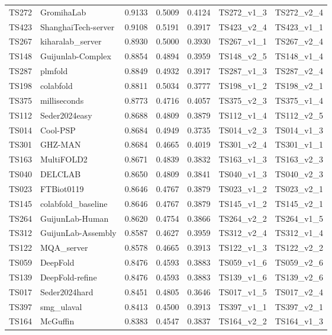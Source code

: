 \begin{table}[ht]
{\begin{tabular}{llrrrll}
TS272 & GromihaLab & 0.9133 & 0.5009 & 0.4124 & TS272\_v1\_3 & TS272\_v2\_4 \\ 
TS423 & ShanghaiTech-server & 0.9108 & 0.5191 & 0.3917 & TS423\_v2\_4 & TS423\_v1\_1 \\ 
TS267 & kiharalab\_server & 0.8930 & 0.5000 & 0.3930 & TS267\_v1\_1 & TS267\_v2\_4 \\ 
TS148 & Guijunlab-Complex & 0.8854 & 0.4894 & 0.3959 & TS148\_v2\_5 & TS148\_v1\_4 \\ 
TS287 & plmfold & 0.8849 & 0.4932 & 0.3917 & TS287\_v1\_3 & TS287\_v2\_4 \\ 
TS198 & colabfold & 0.8811 & 0.5034 & 0.3777 & TS198\_v1\_2 & TS198\_v2\_1 \\ 
TS375 & milliseconds & 0.8773 & 0.4716 & 0.4057 & TS375\_v2\_3 & TS375\_v1\_4 \\ 
TS112 & Seder2024easy & 0.8688 & 0.4809 & 0.3879 & TS112\_v1\_4 & TS112\_v2\_5 \\ 
TS014 & Cool-PSP & 0.8684 & 0.4949 & 0.3735 & TS014\_v2\_3 & TS014\_v1\_3 \\ 
TS301 & GHZ-MAN & 0.8684 & 0.4665 & 0.4019 & TS301\_v2\_4 & TS301\_v1\_1 \\ 
TS163 & MultiFOLD2 & 0.8671 & 0.4839 & 0.3832 & TS163\_v1\_3 & TS163\_v2\_3 \\ 
TS040 & DELCLAB & 0.8650 & 0.4809 & 0.3841 & TS040\_v1\_3 & TS040\_v2\_3 \\ 
TS023 & FTBiot0119 & 0.8646 & 0.4767 & 0.3879 & TS023\_v1\_2 & TS023\_v2\_1 \\ 
TS145 & colabfold\_baseline & 0.8646 & 0.4767 & 0.3879 & TS145\_v1\_2 & TS145\_v2\_1 \\ 
TS264 & GuijunLab-Human & 0.8620 & 0.4754 & 0.3866 & TS264\_v2\_2 & TS264\_v1\_5 \\ 
TS312 & GuijunLab-Assembly & 0.8587 & 0.4627 & 0.3959 & TS312\_v2\_4 & TS312\_v1\_4 \\ 
TS122 & MQA\_server & 0.8578 & 0.4665 & 0.3913 & TS122\_v1\_3 & TS122\_v2\_2 \\ 
TS059 & DeepFold & 0.8476 & 0.4593 & 0.3883 & TS059\_v1\_6 & TS059\_v2\_6 \\ 
TS139 & DeepFold-refine & 0.8476 & 0.4593 & 0.3883 & TS139\_v1\_6 & TS139\_v2\_6 \\ 
TS017 & Seder2024hard & 0.8451 & 0.4805 & 0.3646 & TS017\_v1\_5 & TS017\_v2\_4 \\ 
TS397 & smg\_ulaval & 0.8413 & 0.4500 & 0.3913 & TS397\_v1\_1 & TS397\_v2\_1 \\ 
TS164 & McGuffin & 0.8383 & 0.4547 & 0.3837 & TS164\_v2\_2 & TS164\_v1\_3 \\ 

\end{tabular}}
\end{table}
